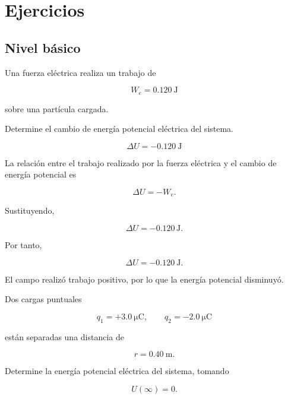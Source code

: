 \section{Ejercicios}

\subsection{Nivel básico}

\begin{ejercicio}

Una fuerza eléctrica realiza un trabajo de

\[
W_e=\SI{0.120}{\joule}
\]

sobre una partícula cargada.

Determine el cambio de energía potencial eléctrica del sistema.

\end{ejercicio}

\begin{respuesta}

\[
\boxed{\Delta U=-\SI{0.120}{\joule}}
\]

\end{respuesta}

\begin{explicacion}

La relación entre el trabajo realizado por la fuerza eléctrica y el cambio de
energía potencial es

\[
\Delta U=-W_e.
\]

Sustituyendo,

\[
\Delta U=-0.120\,\si{\joule}.
\]

Por tanto,

\[
\boxed{\Delta U=-\SI{0.120}{\joule}}.
\]

El campo realizó trabajo positivo, por lo que la energía potencial disminuyó.

\end{explicacion}


\begin{ejercicio}

Dos cargas puntuales

\[
q_1=+\SI{3.0}{\micro\coulomb},
\qquad
q_2=-\SI{2.0}{\micro\coulomb}
\]

están separadas una distancia de

\[
r=\SI{0.40}{\metre}.
\]

Determine la energía potencial eléctrica del sistema, tomando

\[
U(\infty)=0.
\]

\end{ejercicio}

